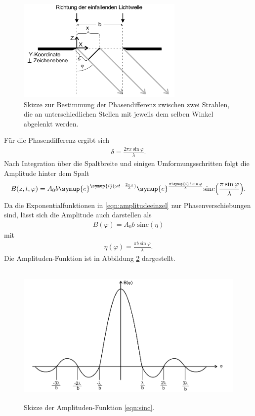 \begin{figure}
  \centering
  \includegraphics[height=5cm]{MeinePics/phasenbeziehung.png}
  \caption{Skizze zur Bestimmung der Phasendifferenz zwischen zwei Strahlen,
  die an unterschiedlichen Stellen mit jeweils dem selben Winkel abgelenkt
  werden.\cite{anleitung}}
  \label{fig:phasenbeziehung}
\end{figure}

\FloatBarrier

Für die Phasendifferenz ergibt sich
\begin{align}
  \delta = \frac{2 \pi x \sin{\varphi}}{\lambda}.
\end{align}
Nach Integration über die Spaltbreite und einigen Umformungsschritten folgt
die Amplitude hinter dem Spalt
\begin{align}
  B(z,t,\varphi) = A_0 b \symup{e}^{\symup{i}(\omega t - \frac{2 \pi z}{\lambda})}
  \symup{e}^{\frac{\pi \symup{i} b \sin{\varphi}}{\lambda}}
  \text{sinc}\Bigl(\frac{\pi \sin{\varphi}}{\lambda}\Bigr).
  \label{eqn:amplitudeeinzel}
\end{align}
Da die Exponentialfunktionen in \eqref{eqn:amplitudeeinzel} nur
Phasenverschiebungen sind, lässt sich die Amplitude auch darstellen als
\begin{align}
  B(\varphi) = A_0 b \text{  sinc}(\eta)
  \label{eqn:sinc}
\end{align}
mit
\begin{align}
  \eta(\varphi) = \frac{\pi b \sin{\varphi}}{\lambda}.
  \label{eqn:eta}
\end{align}
Die Amplituden-Funktion ist in Abbildung \ref{fig:sincf} dargestellt.

\begin{figure}
  \centering
  \includegraphics[height=7cm]{MeinePics/sinc.png}
  \caption{Skizze der Amplituden-Funktion \eqref{eqn:sinc}.\cite{anleitung}}
  \label{fig:sincf}
\end{figure}

